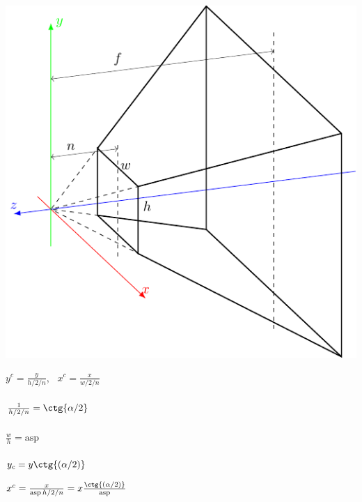 \documentclass[10pt]{beamer}
\begin{document}
	\begin{frame}
		{
			\includegraphics[page=2]{cvv.pdf}
		}
		{
			
			
			$y^c = \displaystyle\frac {y}  {h/2/n} $, \  
			$x^c = \displaystyle\frac {x}  {w/2/n} $ 
			\\ ~ \\
			
			
			$\frac{1}{h/2/n} = \ctg{\alpha/2}$	 \\~\\
			
			$\frac w h = \text{asp}$	
				\\ ~ \\[5em]
				
			
			$y_c  = y \ctg{(\alpha/2)}$
			
			$x^c = \frac x {\text{asp} \, h /2 /n } = x \frac{\ctg{(\alpha/2)}}{\text{asp}} $ \\~\\
			
			 \\ ~ \\
		
		}
	\end{frame}
	
\end{document}
